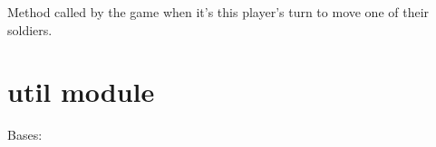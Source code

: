 \documentclass[letterpaper,10pt,english,openany,oneside]{sphinxmanual}
\begin{document}
\begin{fulllineitems}
\begin{fulllineitems}
\end{fulllineitems}


\begin{fulllineitems}
\label{\detokenize{player:player.StrategyPlayer.move_soldier}}
Method called by the game when it’s this player’s turn to move one of
their soldiers.

\end{fulllineitems}


\end{fulllineitems}



\section{util module}
\label{\detokenize{util:module-util}}\label{\detokenize{util:util-module}}\label{\detokenize{util::doc}}

\begin{fulllineitems}
\label{\detokenize{util:util.Color}}
Bases: 

\begin{fulllineitems}
\label{\detokenize{util:util.Color.BLACK}}
\end{fulllineitems}


\begin{fulllineitems}
\label{\detokenize{util:util.Color.WHITE}}
\end{fulllineitems}


\begin{fulllineitems}
\label{\detokenize{util:util.Color.color_names}}
\end{fulllineitems}


\end{fulllineitems}
\end{document}
